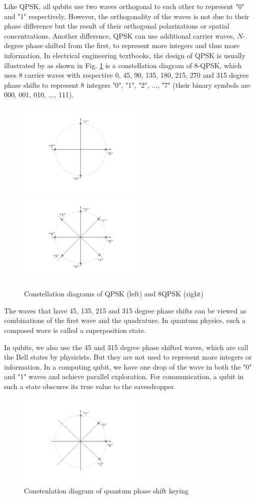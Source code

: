 \documentclass{book}
\begin{document}
Like QPSK, all qubits use two waves orthogonal to each other to represent "0" and "1" respectively. However, the orthogonality of the waves is not due to their phase difference but the result of their orthogonal polarizations or spatial concentrations. Another difference, QPSK can use additional carrier waves, $N$-degree phase shifted from the first, to represent more integers and thus more information. In electrical engineering textbooks, the design of QPSK is usually illustrated by as shown in Fig. \ref{8QPSK} is a constellation diagram of 8-QPSK, which uses 8 carrier waves with respective 0, 45, 90, 135, 180, 215, 270 and 315 degree phase shifts to represent 8 integers "0", "1", "2", ..., "7" (their binary symbols are 000, 001, 010, ..., 111).
\begin{figure}[ht]
\includegraphics[width=6cm]{4qpsk.jpg}
\includegraphics[width=6cm]{8qpsk.jpg}
\caption{Constellation diagrams of QPSK (left) and 8QPSK (right)}
\label{8QPSK}
\end{figure}
The waves that have 45, 135, 215 and 315 degree phase shifts can be viewed as combinations of the first wave and the quadrature. In quantum physics, such a composed wave is called a superposition state.

In qubits, we also use the 45 and 315 degree phase shifted waves, which are call the Bell states by physicists. But they are not used to represent more integers or information. In a computing qubit, we have one drop of the wave in both the "0" and "1" waves and achieve parallel exploration. For communication, a qubit in such a state obscures its true value to the eavesdropper. 
\begin{figure}[ht]
\includegraphics[width=6cm]{qqpsk.jpg}
\caption{Constenlation diagram of quantum phase shift keying}
\label{qQPSK}
\end{figure}
\end{document}
